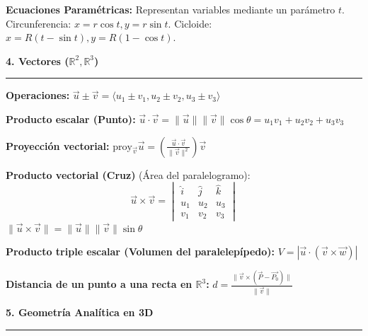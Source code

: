 \documentclass[10pt, landscape, twocolumn]{article}
\newcommand{\cheatsheetsection}[1]{
    \vspace{0.6em}
    {\color{themeblue}\large\bfseries #1} \par
    \vspace{-0.5em}
    {\color{themeblue}\rule{\linewidth}{1pt}} \par
    \vspace{0.2em}
}
\begin{document}
\textbf{Ecuaciones Paramétricas:} Representan variables mediante un parámetro $t$.
Circunferencia: $x = r\cos t, y = r\sin t$.
Cicloide: $x = R(t - \sin t), y = R(1 - \cos t)$.

\cheatsheetsection{4. Vectores ($\mathbb{R}^2, \mathbb{R}^3$)}
\textbf{Operaciones:} $\vec{u} \pm \vec{v} = \langle u_1 \pm v_1, u_2 \pm v_2, u_3 \pm v_3 \rangle$

\textbf{Producto escalar (Punto):} $\vec{u} \cdot \vec{v} = \|\vec{u}\|\|\vec{v}\|\cos\theta = u_1 v_1 + u_2 v_2 + u_3 v_3$

\textbf{Proyección vectorial:} $\text{proy}_{\vec{v}}\vec{u} = \left(\frac{\vec{u} \cdot \vec{v}}{\|\vec{v}\|^2}\right)\vec{v}$

\textbf{Producto vectorial (Cruz)} (Área del paralelogramo):
\[ \vec{u} \times \vec{v} = \begin{vmatrix} \hat{i} & \hat{j} & \hat{k} \\ u_1 & u_2 & u_3 \\ v_1 & v_2 & v_3 \end{vmatrix} \]
$\|\vec{u} \times \vec{v}\| = \|\vec{u}\| \|\vec{v}\| \sin \theta$

\vspace{-0.5em}
\begin{center}
\end{center}
\vspace{-0.5em}

\textbf{Producto triple escalar (Volumen del paralelepípedo):}
$V = |\vec{u} \cdot (\vec{v} \times \vec{w})|$

\textbf{Distancia de un punto a una recta en $\mathbb{R}^3$:}
$d = \frac{\|\vec{v} \times (\vec{P} - \vec{P_0})\|}{\|\vec{v}\|}$

\cheatsheetsection{5. Geometría Analítica en 3D}
\end{document}
